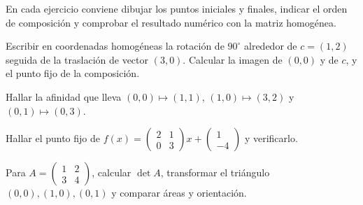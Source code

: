 En cada ejercicio conviene dibujar los puntos iniciales y finales, indicar el orden de
composición y comprobar el resultado numérico con la matriz homogénea.

\begin{ejercicio}
Escribir en coordenadas homogéneas la rotación de \(90^\circ\) alrededor de \(c=(1,2)\)
seguida de la traslación de vector \((3,0)\). Calcular la imagen de \((0,0)\) y de \(c\), y el
punto fijo de la composición.
\end{ejercicio}

\begin{ejercicio}
Hallar la afinidad que lleva \((0,0)\mapsto(1,1)\), \((1,0)\mapsto(3,2)\) y
\((0,1)\mapsto(0,3)\).
\end{ejercicio}

\begin{ejercicio}
Hallar el punto fijo de \(f(x)=\begin{pmatrix}2&1\\0&3\end{pmatrix}x+\begin{pmatrix}1\\-4\end{pmatrix}\)
y verificarlo.
\end{ejercicio}

\begin{ejercicio}
Para \(A=\begin{pmatrix}1&2\\3&4\end{pmatrix}\), calcular \(\det A\), transformar el triángulo
\((0,0),(1,0),(0,1)\) y comparar áreas y orientación.
\end{ejercicio}

